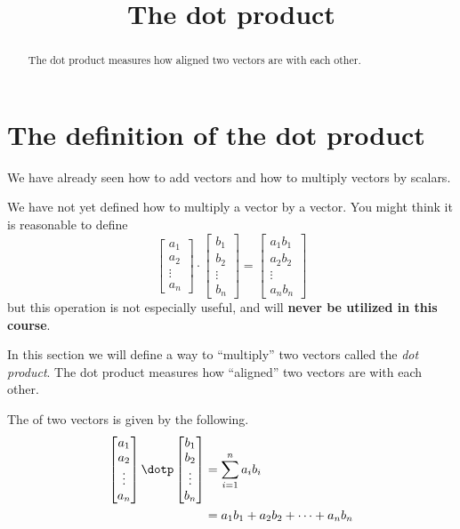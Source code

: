 \documentclass{ximera}
\title[Dig-In:]{The dot product}
\begin{document}
\begin{abstract}
  The dot product measures how aligned two vectors are with each
  other.
\end{abstract}
\maketitle


\section{The definition of the dot product}

We have already seen how to add vectors and how to multiply vectors by
scalars.

\begin{warning}
We have not yet defined how to multiply a vector by a vector.  You
might think it is reasonable to define
\[
\begin{bmatrix}
  a_1\\
  a_2\\
  \vdots\\
  a_n
\end{bmatrix}
\cdot
\begin{bmatrix}
  b_1\\
  b_2\\
  \vdots\\
  b_n
\end{bmatrix}
=
\begin{bmatrix}
  a_1b_1\\
  a_2b_2\\
  \vdots\\
  a_nb_n
\end{bmatrix}
\] 
but this operation is not especially useful, and will \textbf{never be
  utilized in this course}.
\end{warning}

In this section we will define a way to ``multiply'' two vectors
called the \textit{dot product}. The dot product measures how
``aligned'' two vectors are with each other.

\begin{definition}
  The  of two vectors is given by the following.
  \begin{align*}
  \begin{bmatrix}
    a_1\\
    a_2\\
    \vdots\\
    a_n
  \end{bmatrix}
  \dotp
  \begin{bmatrix}
    b_1\\
    b_2\\
    \vdots\\
    b_n
  \end{bmatrix}
  &= \sum_{i=1}^n a_ib_i\\
  &= a_1b_1 + a_2b_2 +\dots+a_nb_n
  \end{align*}
\end{definition}
\end{document}
